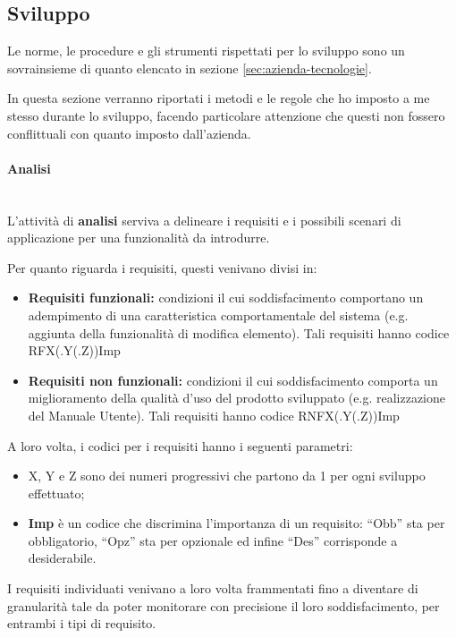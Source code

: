 \subsection{Sviluppo}

Le norme, le procedure e gli strumenti rispettati per lo sviluppo sono un
sovrainsieme di quanto elencato in sezione \ref{sec:azienda-tecnologie}.

In questa sezione verranno riportati i metodi e le regole che ho imposto a me
stesso durante lo sviluppo, facendo particolare attenzione che questi non
fossero conflittuali con quanto imposto dall'azienda.

\paragraph{Analisi} \mbox{} \\

L'attività di \textbf{analisi} serviva a delineare i requisiti e i possibili
scenari di applicazione per una funzionalità da introdurre.

Per quanto riguarda i requisiti, questi venivano divisi in:

\begin{itemize}
\item \textbf{Requisiti funzionali:} condizioni il cui soddisfacimento
  comportano un adempimento di una caratteristica comportamentale del sistema
  (e.g. aggiunta della funzionalità di modifica elemento). Tali requisiti hanno codice RFX(.Y(.Z))Imp
\item \textbf{Requisiti non funzionali:} condizioni il cui soddisfacimento
  comporta un miglioramento della qualità d'uso del prodotto sviluppato (e.g.
  realizzazione del Manuale Utente). Tali requisiti hanno codice
  RNFX(.Y(.Z))Imp
\end{itemize}

A loro volta, i codici per i requisiti hanno i seguenti parametri:

\begin{itemize}
\item X, Y e Z sono dei numeri progressivi che partono da 1 per ogni sviluppo
  effettuato;
\item \textbf{Imp} è un codice che discrimina l'importanza di un requisito:
  ``Obb'' sta per obbligatorio, ``Opz'' sta per opzionale ed infine ``Des''
  corrisponde a desiderabile.
\end{itemize}

I requisiti individuati venivano a loro volta frammentati fino a diventare di
granularità tale da poter monitorare con precisione il loro soddisfacimento,
per entrambi i tipi di requisito.

